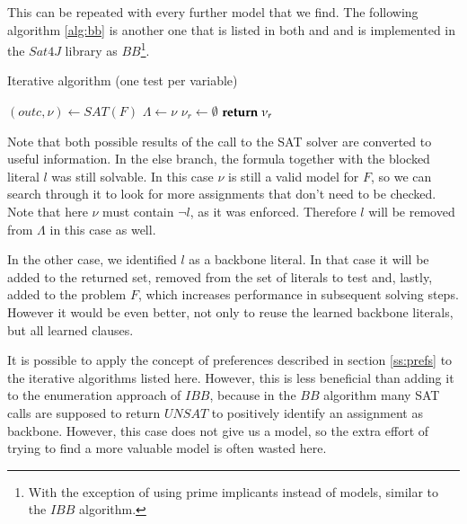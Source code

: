This can be repeated with every further model that we find. The following algorithm \ref{alg:bb} is another one that is listed in both \cite{mjl10} and \cite{mjl15} and is implemented in the $Sat4J$ library as $BB$\footnote{With the exception of using prime implicants instead of models, similar to the $IBB$ algorithm.}.

\begin{algorithm}
\caption{{\sc Iterative algorithm (one test per variable)}}
\label{alg:bb}
\DontPrintSemicolon
{}

$(outc,\nu) \gets SAT(F)$\;
$\Lambda \gets \nu$\;
$\nu_r \gets \emptyset$\;
$\Return \; \nu_r$\;
\end{algorithm}

Note that both possible results of the call to the SAT solver are converted to useful information. In the else branch, the formula together with the blocked literal $l$ was still solvable. In this case $\nu$ is still a valid model for $F$, so we can search through it to look for more assignments that don't need to be checked. Note that here $\nu$ must contain $\neg l$, as it was enforced. Therefore $l$ will be removed from $\Lambda$ in this case as well.

In the other case, we identified $l$ as a backbone literal. In that case it will be added to the returned set, removed from the set of literals to test and, lastly, added to the problem $F$, which increases performance in subsequent solving steps. However it would be even better, not only to reuse the learned backbone literals, but all learned clauses.

It is possible to apply the concept of preferences described in section \ref{ss:prefs} to the iterative algorithms listed here. However, this is less beneficial than adding it to the enumeration approach of $IBB$, because in the $BB$ algorithm many SAT calls are supposed to return $UNSAT$ to positively identify an assignment as backbone. However, this case does not give us a model, so the extra effort of trying to find a more valuable model is often wasted here.

